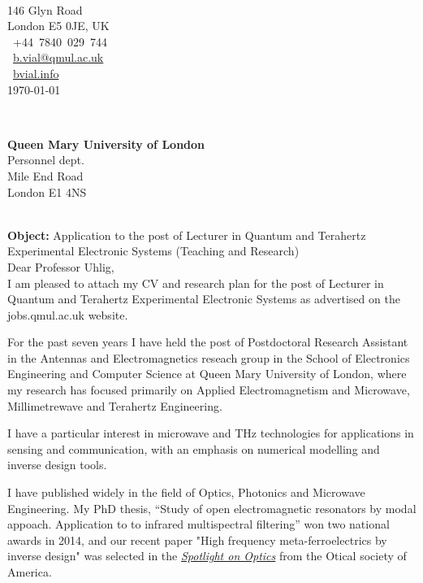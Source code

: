 \documentclass{academia}
\begin{document}
\hfill%
\begin{minipage}[t]{.5\textwidth}
\\
146 Glyn Road\\
London E5 0JE, UK\\
~+44~7840~029~744\\
~\href{mailto:b.vial@qmul.ac.uk}{b.vial@qmul.ac.uk}\\
~\href{www.bvial.info}{bvial.info}
\\[2em]
\today
\end{minipage}\\[1em]
\begin{minipage}[t]{.5\textwidth}
    \begin{flushleft}
        \textbf{Queen Mary University of London}\\
Personnel dept.\\
Mile End Road\\
London E1 4NS
    \end{flushleft}
\end{minipage}
\hfill %
\\[2em]
\textbf{Object:} Application to the post of Lecturer in Quantum and Terahertz Experimental Electronic
Systems (Teaching and Research)\\[1.5em]

Dear Professor Uhlig,\\[1em]


I am pleased to attach my CV and research plan for the post of
Lecturer in Quantum and Terahertz Experimental Electronic
Systems as advertised on the jobs.qmul.ac.uk website.

For the past seven years I have held the post of Postdoctoral Research
Assistant in the Antennas and Electromagnetics reseach group in
the School of Electronics Engineering and Computer Science
at Queen Mary University of London, where my research
has focused primarily on Applied Electromagnetism and Microwave, Millimetrewave
and Terahertz Engineering.

I have a particular interest in microwave and THz technologies
for applications in sensing and communication, with an emphasis on numerical
modelling and inverse design tools.

I have published widely in the field of Optics, Photonics
and Microwave Engineering.
My PhD thesis, “Study of open electromagnetic resonators by modal appoach. 
Application to to infrared multispectral filtering” won two national awards in 2014, and
our recent paper "High frequency meta-ferroelectrics by inverse design" was selected
in the \textit{\href{https://www.osapublishing.org/spotlight/summary.cfm?id=450295}{Spotlight on Optics}}
from the Otical society of America.
\end{document}
